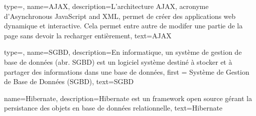 {
    type=\acronymtype,
    name={AJAX},
    description={L'architecture AJAX, acronyme d'Asynchronous JavaScript and XML, permet de créer des applications web dynamique et interactive\cite{wiki:AJAX}. Cela permet entre autre de modifer une partie de la page sans devoir la recharger entièrement},
    text={AJAX}
}

{
    type=\acronymtype,
    name={SGBD},
    description={En informatique, un système de gestion de base de données (abr. SGBD) est un logiciel système destiné à stocker et à partager des informations dans une base de données\cite{wiki:SGBD}},
    first = {Système de Gestion de Base de Données (SGBD)},
    text={SGBD}
}

{
    name={Hibernate},
    description={Hibernate est un framework open source gérant la persistance des objets en base de données relationnelle\cite{wiki:hibernate}},
    text={Hibernate}
}